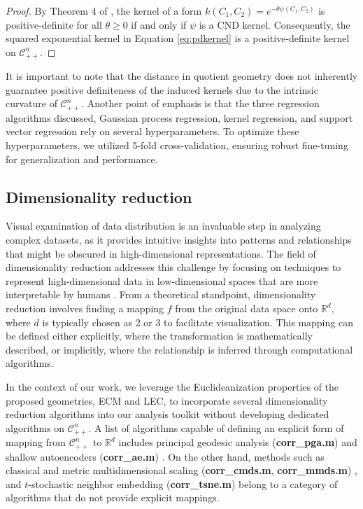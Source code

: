 \documentclass[10pt]{article}
\newcommand{\CORR}{\mathcal{C}_{++}^n}
\begin{document}
\begin{proof}
	By Theorem 4 of \citet{schoenberg_1938_MetricSpacesCompletely}, the kernel of a form $k(C_1, C_2) = e^{-\theta \psi(C_1, C_2)}$ is positive-definite for all $\theta \geq 0$ if and only if $\psi$ is a CND kernel. Consequently, the squared exponential kernel in Equation \eqref{eq:pdkernel} is a positive-definite kernel on $\CORR$.
\end{proof}

It is important to note that the distance in quotient geometry does not inherently guarantee positive definiteness of the induced kernels due to the intrinsic curvature of $\CORR$. Another point of emphasis is that the three regression algorithms discussed, Gaussian process regression, kernel regression, and support vector regression rely on several hyperparameters. To optimize these hyperparameters, we utilized 5-fold cross-validation, ensuring robust fine-tuning for generalization and performance.


\subsection{Dimensionality reduction}

Visual examination of data distribution is an invaluable step in analyzing complex datasets, as it provides intuitive insights into patterns and relationships that might be obscured in high-dimensional representations. The field of dimensionality reduction addresses this challenge by focusing on techniques to represent high-dimensional data in low-dimensional spaces that are more interpretable by humans \citep{engel_2012_SurveyDimensionReduction, you_2022_RdimtoolsPackageDimension}. From a theoretical standpoint, dimensionality reduction involves finding a mapping $f$ from the original data space onto $\mathbb{R}^d$, where $d$ is typically chosen as 2 or 3 to facilitate visualization. This mapping can be defined either explicitly, where the transformation is mathematically described, or implicitly, where the relationship is inferred through computational algorithms.

In the context of our work, we leverage the Euclideanization properties of the proposed geometries, ECM and LEC, to incorporate several dimensionality reduction algorithms into our analysis toolkit without developing dedicated algorithms on $\CORR$. A list of algorithms capable of defining an explicit form of mapping from $\CORR$ to $\mathbb{R}^d$ includes principal geodesic analysis (\textbf{corr\_pga.m}) \citep{fletcher_2004_PrincipalGeodesicAnalysis} and shallow autoencoders (\textbf{corr\_ae.m}) \citep{baldi_1989_NeuralNetworksPrincipal}. On the other hand, methods such as classical and metric multidimensional scaling (\textbf{corr\_cmds.m}, \textbf{corr\_mmds.m}) \citep{borg_1997_ModernMultidimensionalScaling}, and $t$-stochastic neighbor embedding (\textbf{corr\_tsne.m}) \citep{vandermaaten_2008_VisualizingDataUsing} belong to a category of algorithms that do not provide explicit mappings.
\end{document}
